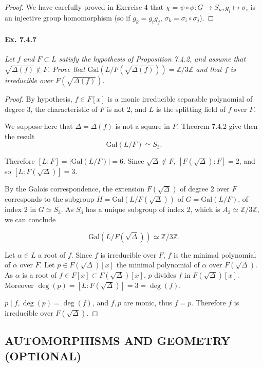 \documentclass[11pt,a4paper]{article}
\newcommand{\Z}{\mathbb{Z}}
\newcommand{\Gal}{\mathrm{Gal}}
\begin{document}
\begin{proof}
We have carefully proved in Exercise 4 that $\chi = \psi \circ \phi : G \to S_n, g_i \mapsto \sigma_i$ is an injective group homomorphism (so if $g_k = g_i g_j$, $\sigma_k = \sigma_i \circ \sigma_j$).

\end{proof}

\paragraph{Ex. 7.4.7}

{\it Let $f$ and $F\subset L$ satisfy the hypothesis of Proposition 7.4.2, and assume that $\sqrt{\Delta(f)} \not \in F$. Prove that $\Gal\left(L/F\left(\sqrt{\Delta(f)}\right)\right) = \Z/3\Z$ and that $f$ is irreducible over $F\left(\sqrt{\Delta(f)}\right)$.
}

\begin{proof}
By hypothesis, $f\in F[x]$ is a monic irreducible separable polynomial of degree 3, the characteristic of $F$ is not 2, and $L$ is the splitting field of $f$ over $F$.

We suppose here that $\Delta = \Delta(f)$ is not a square in $F$. Theorem 7.4.2 give then the result
$$\Gal(L/F) \simeq S_3.$$

Therefore $[L:F] = \vert \Gal(L/F) \vert = 6$. Since $\sqrt{\Delta} \not \in F$, $[F(\sqrt{\Delta}) : F] = 2$, and so $[L : F(\sqrt{\Delta})] = 3$.

By the Galois correspondence, the extension $F(\sqrt{\Delta})$ of degree 2 over $F$ corresponds to the subgroup $H = \Gal(L/F(\sqrt{\Delta}))$ of $G = \Gal(L/F)$, of index 2 in $G\simeq S_3$. As $S_3$ has a unique subgroup of index 2, which is $A_3 \simeq \Z/3\Z$, we can conclude

$$\Gal(L/F(\sqrt{\Delta})) \simeq \Z/3\Z.$$

Let $\alpha \in L$ a root of $f$. Since $f$ is irreducible over $F$, $f$ is the minimal polynomial of $\alpha$ over $F$. Let $p \in F(\sqrt{\Delta})[x]$ the minimal polynomial of $\alpha$ over $F(\sqrt{\Delta})$. As $\alpha$ is a root of $f \in F[x] \subset F(\sqrt{\Delta})[x]$, $p$ divides $f$ in $F(\sqrt{\Delta})[x]$. Moreover $\deg(p) = [L:F(\sqrt{\Delta})] = 3 = \deg(f)$.

$p \mid f, \deg(p) = \deg(f)$, and $f,p$ are monic, thus $f = p$. Therefore $f$ is irreducible over $F(\sqrt{\Delta})$.
\end{proof}

\subsection{AUTOMORPHISMS AND GEOMETRY (OPTIONAL)}
\end{document}
